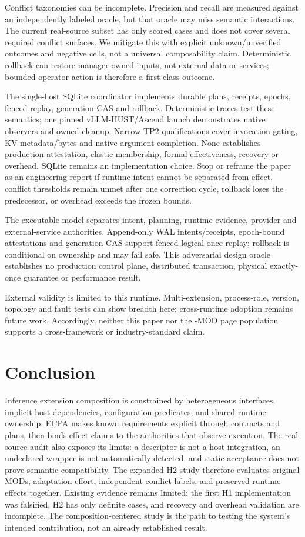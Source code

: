 \documentclass[letterpaper,twocolumn,10pt]{article}
\begin{document}
Conflict taxonomies can be incomplete.  Precision and recall are measured
against an independently labeled oracle, but that oracle may miss semantic
interactions.  The current real-source subset has only \ECPAHTwoScoredCases{} scored cases and
does not cover several required conflict surfaces.  We mitigate this with
explicit unknown/unverified outcomes and negative cells, not a universal
composability claim.  Deterministic rollback
can restore manager-owned inputs, not external data or services; bounded
operator action is therefore a first-class outcome.

The single-host SQLite coordinator implements durable plans, receipts, epochs,
fenced replay, generation CAS and rollback. Deterministic traces test these
semantics; one pinned vLLM-HUST/Ascend launch demonstrates native observers and
owned cleanup. Narrow TP2 qualifications cover invocation gating, KV
metadata/bytes and native argument completion. None establishes production
attestation, elastic membership, formal effectiveness, recovery or overhead.
SQLite remains an implementation choice.
Stop or reframe the paper as an engineering report if runtime intent cannot
be separated from effect, conflict thresholds remain unmet after one correction
cycle, rollback loses the predecessor, or overhead exceeds the frozen bounds.

The executable model separates intent, planning, runtime evidence, provider
and external-service authorities.  Append-only WAL intents/receipts, epoch-bound
attestations and generation CAS support fenced logical-once replay; rollback
is conditional on ownership and may fail safe.  This adversarial design oracle
establishes no production control plane, distributed transaction, physical
exactly-once guarantee or performance result.

External validity is limited to this runtime. Multi-extension, process-role,
version, topology and fault tests can show breadth here; cross-runtime adoption
remains future work. Accordingly, neither this
paper nor the \ECPAWorkshopMods{}-MOD page population
supports a cross-framework or industry-standard claim.

\section{Conclusion}
Inference extension composition is constrained by heterogeneous interfaces,
implicit host dependencies, configuration predicates, and shared runtime
ownership. ECPA makes known requirements explicit through contracts and
plans, then binds effect claims to the authorities that observe execution.
The real-source audit also exposes its limits: a descriptor is not a host
integration, an undeclared wrapper is not automatically detected, and static
acceptance does not prove semantic compatibility. The expanded H2 study
therefore evaluates original MODs, adaptation effort, independent conflict
labels, and preserved runtime effects together. Existing evidence remains
limited: the first H1 implementation was falsified, H2 has only
\ECPAHTwoScoredCases{} definite cases, and recovery and overhead validation
are incomplete. The composition-centered study is the path to testing the
system's intended contribution, not an already established result.



\end{document}
